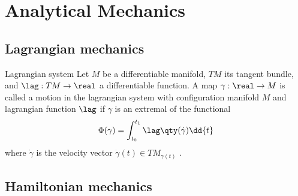 \chapter{Analytical Mechanics}

\section{Lagrangian mechanics}
\begin{block}{Lagrangian system}
    Let \(M\) be a differentiable manifold, \(TM\) its tangent bundle, and \(\lag: TM \to \real\) a differentiable function. A map \(\gamma: \real \to M\)  is called a motion in the lagrangian system with configuration manifold \(M\) and lagrangian function \(\lag\) if \(\gamma\) is an extremal of the functional
    \[
     \Phi(\gamma) =  \int^{t_1}_{t_0} \lag\qty(\dot{\gamma})\dd{t}
\]
    where \(\dot{\gamma}\) is the velocity vector \(\dot{\gamma}(t) \in TM_{\gamma(t)}\) \cite{Arnold1989}.
\end{block}

\section{Hamiltonian mechanics}